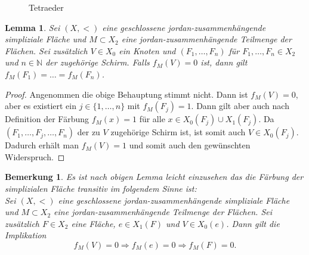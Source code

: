 \documentclass[12pt,titlepage]{article}
\newtheorem{lemma}{Lemma}
\newtheorem{bemerkung}{Bemerkung}[section]
\begin{document}
\begin{figure}[H]

 \caption{Tetraeder }
 \label{Tetraeder}
 \end{figure}
\begin{lemma}
Sei $(X,<)$ eine geschlossene jordan-zusammenhängende simpliziale Fläche und $M \subset X_2$ eine jordan-zusammenhängende Teilmenge der Flächen. Sei zusätzlich $V\in X_0$ ein Knoten und $(F_1,\ldots,F_n)$ für $F_1,\ldots,F_n \in X_2$ und $n \in \mathbb{N}$ der zugehörige Schirm. Falls $f_M(V)=0$ ist, dann gilt $f_M(F_1)=\ldots=f_M(F_n)$.
\end{lemma}
\begin{proof}
Angenommen die obige Behauptung stimmt nicht. Dann ist $f_M(V)=0$, aber es existiert ein $j\in \{1,\ldots,n\}$ mit $f_M(F_j)=1$. Dann gilt aber auch nach Definition der Färbung $f_M(x)=1$ für alle $x \in X_0(F_j)\cup X_1(F_j)$. Da $(F_1,\ldots,F_j,\ldots,F_n)$ der zu $V$ zugehörige Schirm ist, ist somit auch $V\in X_0(F_j)$. Dadurch erhält man $f_M(V)=1$ und somit auch den gewünschten Widerspruch.
\end{proof}
\begin{bemerkung}
Es ist nach obigen Lemma leicht einzusehen das die Färbung der simplizialen Fläche transitiv im folgendem Sinne ist:\\
Sei $(X,<)$ eine geschlossene jordan-zusammenhängende simpliziale Fläche und $M \subset X_2$ eine jordan-zusammenhängende Teilmenge der Flächen. Sei zusätzlich $F\in X_2$ eine Fläche, $e\in X_1(F)$ und $V\in X_0(e)$. Dann gilt die Implikation 
\[
f_M(V)=0 \Rightarrow f_M(e)=0 \Rightarrow f_M(F)=0.
\]
\end{bemerkung}
\end{document}
